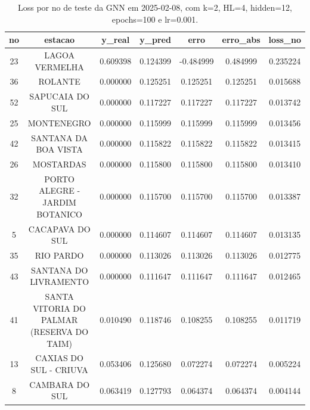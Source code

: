 \begin{table}[h]
\centering
\caption{Loss por no de teste da GNN em 2025-02-08, com k=2, HL=4, hidden=12, epochs=100 e lr=0.001.}
\label{tab:gnn_loss_k2_hl4_h12_e100_d20250208}
\begin{tabular}{ccccccc}
\toprule
no & estacao & y\_real & y\_pred & erro & erro\_abs & loss\_no \\
\midrule
23 & LAGOA VERMELHA & 0.609398 & 0.124399 & -0.484999 & 0.484999 & 0.235224 \\
36 & ROLANTE & 0.000000 & 0.125251 & 0.125251 & 0.125251 & 0.015688 \\
52 & SAPUCAIA DO SUL & 0.000000 & 0.117227 & 0.117227 & 0.117227 & 0.013742 \\
25 & MONTENEGRO & 0.000000 & 0.115999 & 0.115999 & 0.115999 & 0.013456 \\
42 & SANTANA DA BOA VISTA & 0.000000 & 0.115822 & 0.115822 & 0.115822 & 0.013415 \\
26 & MOSTARDAS & 0.000000 & 0.115800 & 0.115800 & 0.115800 & 0.013410 \\
32 & PORTO ALEGRE - JARDIM BOTANICO & 0.000000 & 0.115700 & 0.115700 & 0.115700 & 0.013387 \\
5 & CACAPAVA DO SUL & 0.000000 & 0.114607 & 0.114607 & 0.114607 & 0.013135 \\
35 & RIO PARDO & 0.000000 & 0.113026 & 0.113026 & 0.113026 & 0.012775 \\
43 & SANTANA DO LIVRAMENTO & 0.000000 & 0.111647 & 0.111647 & 0.111647 & 0.012465 \\
41 & SANTA VITORIA DO PALMAR (RESERVA DO TAIM) & 0.010490 & 0.118746 & 0.108255 & 0.108255 & 0.011719 \\
13 & CAXIAS DO SUL - CRIUVA & 0.053406 & 0.125680 & 0.072274 & 0.072274 & 0.005224 \\
8 & CAMBARA DO SUL & 0.063419 & 0.127793 & 0.064374 & 0.064374 & 0.004144 \\
\bottomrule
\end{tabular}
\end{table}

